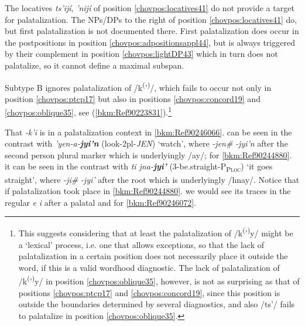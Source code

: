 \documentclass[output=paper]{langscibook}
\begin{document}
The locatives \textit{ts'ijí}, \textit{'nijí} of position \ref{chovpos:locatives41} do not provide a target for palatalization. The NPs/DPs to the right of position \ref{chovpos:locatives41} do, but first palatalization is not documented there. First palatalization does occur in the postpositions in position \ref{chovpos:adpositionsappl44}, but is always triggered by their complement in position \ref{chovpos:lightDP43} which in turn does not palatalize, so it cannot define a maximal subspan.

Subtype B ignores palatalization of /k\textsuperscript{(}'\textsuperscript{)}/, which fails to occur not only in position \ref{chovpos:ptcp17} but also in positions \ref{chovpos:concord19} and \ref{chovpos:oblique35}, see (\ref{bkm:Ref90223831}).\footnote{This suggests considering that at least the palatalization of /k\textsuperscript{(}'\textsuperscript{)}y/ might be a `lexical' process, i.e. one that allows exceptions, so that the lack of palatalization in a certain position does not necessarily place it outside the word, if this is a valid wordhood diagnostic. The lack of palatalization of /k\textsuperscript{(}'\textsuperscript{)}y/ in position \ref{chovpos:oblique35}, however, is not as surprising as that of positions \ref{chovpos:ptcp17} and \ref{chovpos:concord19}, since this position is outside the boundaries determined by several diagnostics, and also /ts'/ fails to palatalize in position \ref{chovpos:oblique35}.}

 That \textit{-k'i} is in a palatalization context in \ref{bkm:Ref90246066}. can be seen in the contrast with \textit{'yen-a-}\textbf{\textit{jyi'n}} (look-2pl-\textit{JEN}) `watch', where \textit{-jen\#} \MVRightarrow{} \textit{{}-jyi'n} after the second person plural marker which is underlyingly /ay/; for \ref{bkm:Ref90244880}. it can be seen in the contrast with \textit{ti jna-}\textbf{\textit{jyi'}} (3-be.straight-P\textsc{\textsubscript{Ploc}}) `it goes straight', where \textit{-ji\#} \MVRightarrow{} \textit{{}-jyi'} after the root which is underlyingly /hnay/. Notice that if palatalization took place in \ref{bkm:Ref90244880}. we would see its traces in the regular \textit{e} \MVRightarrow{} \textit{i} after a palatal and for \ref{bkm:Ref90246072}.
\end{document}

